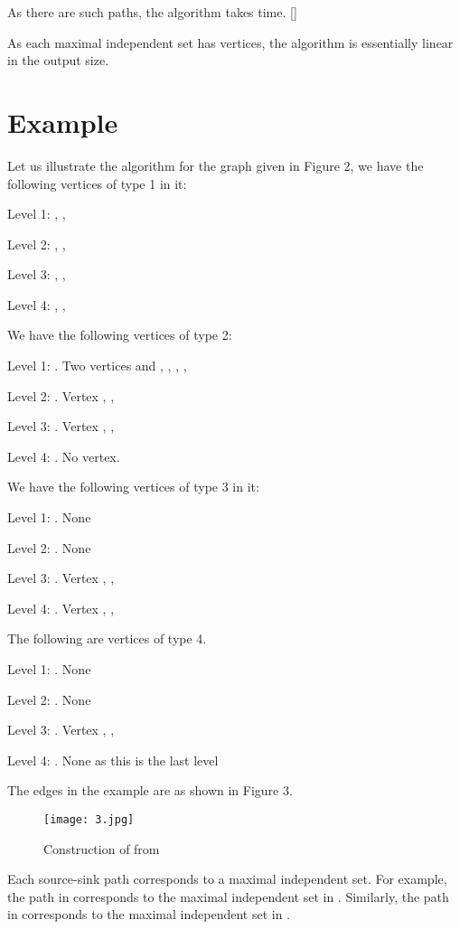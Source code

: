 \documentclass[10pt]{article}
\begin{document}
As there are  such paths, the algorithm takes  time. []

As each maximal independent set has  vertices, the algorithm is
essentially linear in the output size.

\section{Example}

Let us illustrate the algorithm for the graph given in Figure 2, we have
the following vertices of type 1 in it:

 
\noindent Level 1: , , 
 
\noindent Level 2: , , 
 
\noindent Level 3: , , 
 
\noindent Level 4: , , 


We have the following vertices of type 2: 

\noindent Level 1: .  Two vertices  and , ,
, , 
 
\noindent Level 2: . Vertex , , 
 
\noindent Level 3: . Vertex , , 
 
\noindent Level 4: . No vertex. 


We have the following vertices of type 3 in it: 

\noindent Level 1: .  None 
 
\noindent Level 2: .  None
 
\noindent Level 3: .  Vertex , , 
 
\noindent Level 4: .  Vertex , , 


The following are vertices of type 4.

\noindent Level 1: .  None
 
\noindent Level 2: .  None
 
\noindent Level 3: . Vertex , , 
 
\noindent Level 4: . None as this is the last level


The edges in the example are as shown in Figure 3.

\begin{figure}[h]
 \centering
   \texttt{[image: 3.jpg]}
  \caption{Construction of  from }
\end{figure}


Each source-sink path corresponds to a maximal independent set. For
example, the path  in  corresponds to the maximal
independent set  in . Similarly,
the path  in  corresponds to the maximal
independent set  in . 
\end{document}
